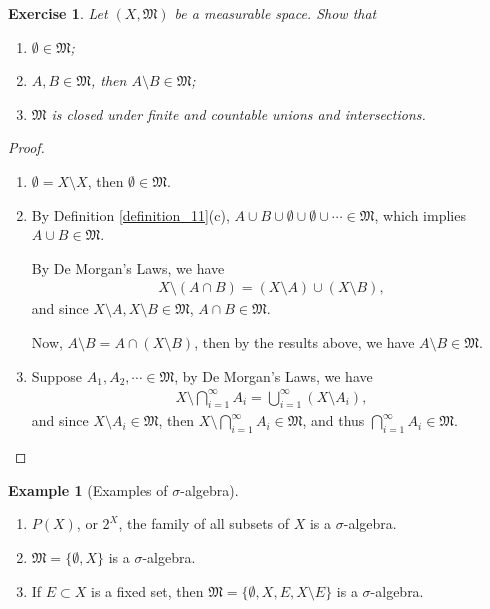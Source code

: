 \documentclass[11pt]{book}
\newtheorem{exercise}{Exercise}[chapter]
\theoremstyle{definition}
\newtheorem{example}{Example}[chapter]
\numberwithin{equation}{chapter}
\def\MM{\mathfrak{M}}
\begin{document}
\medskip

\begin{exercise}\label{exercise_11} {\rm \cite{1}}
Let $(X, \MM)$ be a measurable space. Show that
\begin{enumerate}[label=(\alph*)]
    \item $\emptyset \in \MM$;
    
    \item $A, B \in \MM$, then $A \setminus B \in \MM$;
    
    \item $\MM$ is closed under finite and countable unions and intersections.
\end{enumerate}
\end{exercise}
\begin{proof}
~\begin{enumerate}[label=(\alph*)]
    \item $\emptyset = X \setminus X$, then $\emptyset \in \MM$.
   
    \item By Definition \ref{definition_11}(c), $A \cup B \cup \emptyset \cup \emptyset \cup \cdots \in \MM$, which implies $A \cup B \in \MM$. 
    
    By De Morgan's Laws, we have 
    \begin{align*}
        X \setminus (A \cap B) = (X \setminus A) \cup (X \setminus B),
    \end{align*}
    and since $X \setminus A, X \setminus B \in \MM$, $A \cap B \in \MM$.
    
    Now, $A \setminus B = A \cap (X \setminus B)$, then by the results above, we have $A \setminus B \in \MM$.
    
    \item Suppose $A_1, A_2, \cdots \in \MM$, by De Morgan's Laws, we have
    \begin{align*}
        X \setminus \bigcap^\infty_{i=1} A_i = \bigcup^\infty_{i=1} (X \setminus A_i),
    \end{align*}
    and since $X \setminus A_i \in \MM$, then $X \setminus \bigcap^\infty_{i=1} A_i \in \MM$, and thus $\bigcap^\infty_{i=1} A_i \in \MM$. 
\end{enumerate}
\end{proof}

\medskip

\begin{example}[Examples of $\sigma$-algebra]
~\begin{enumerate}[label=(\alph*)]
    \item $P(X)$, or $2^X$, the family of all subsets of $X$ is a $\sigma$-algebra.
    
    \item $\MM = \{\emptyset, X\}$ is a $\sigma$-algebra.
    
    \item If $E \subset X$ is a fixed set, then $\MM = \{\emptyset, X, E, X\setminus E\}$ is a $\sigma$-algebra.
\end{enumerate}
\end{example}
\end{document}

